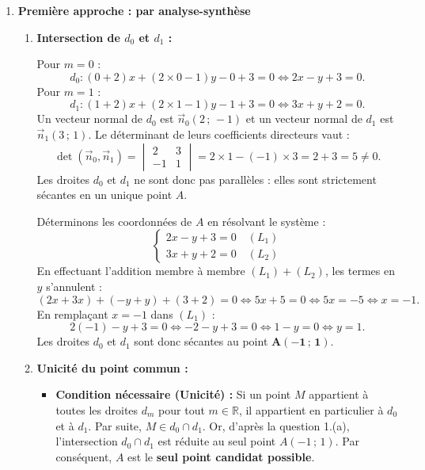 \documentclass[11pt,a4paper]{article}
\newcommand{\R}{\mathbb{R}}
\newcommand{\vect}[1]{\overrightarrow{#1}}
\begin{document}
\begin{correctionbox}
\begin{enumerate}
    \item \textbf{Première approche : par analyse-synthèse}
    \begin{enumerate}
        \item \textbf{Intersection de $d_0$ et $d_1$ :}
        
        Pour $m = 0$ :
        \[
        d_0 : (0 + 2)x + (2 \times 0 - 1)y - 0 + 3 = 0 \iff 2x - y + 3 = 0.
        \]
        Pour $m = 1$ :
        \[
        d_1 : (1 + 2)x + (2 \times 1 - 1)y - 1 + 3 = 0 \iff 3x + y + 2 = 0.
        \]
        Un vecteur normal de $d_0$ est $\vect{n}_0(2\,;\,-1)$ et un vecteur normal de $d_1$ est $\vect{n}_1(3\,;\,1)$.
        Le déterminant de leurs coefficients directeurs vaut :
        \[
        \det(\vect{n}_0, \vect{n}_1) = \begin{vmatrix} 2 & 3 \\ -1 & 1 \end{vmatrix} = 2 \times 1 - (-1) \times 3 = 2 + 3 = 5 \neq 0.
        \]
        Les droites $d_0$ et $d_1$ ne sont donc pas parallèles : elles sont strictement sécantes en un unique point $A$.
        
        Déterminons les coordonnées de $A$ en résolvant le système :
        \[
        \begin{cases}
        2x - y + 3 = 0 \quad (L_1) \\
        3x + y + 2 = 0 \quad (L_2)
        \end{cases}
        \]
        En effectuant l'addition membre à membre $(L_1) + (L_2)$, les termes en $y$ s'annulent :
        \[
        (2x + 3x) + (-y + y) + (3 + 2) = 0 \iff 5x + 5 = 0 \iff 5x = -5 \iff x = -1.
        \]
        En remplaçant $x = -1$ dans $(L_1)$ :
        \[
        2(-1) - y + 3 = 0 \iff -2 - y + 3 = 0 \iff 1 - y = 0 \iff y = 1.
        \]
        Les droites $d_0$ et $d_1$ sont donc sécantes au point $\mathbf{A(-1\,;\,1)}$.

        \item \textbf{Unicité du point commun :}
        
        \begin{itemize}[leftmargin=*]
            \item \textbf{Condition nécessaire (Unicité) :}
            Si un point $M$ appartient à toutes les droites $d_m$ pour tout $m \in \R$, il appartient en particulier à $d_0$ et à $d_1$.
            Par suite, $M \in d_0 \cap d_1$. Or, d'après la question 1.(a), l'intersection $d_0 \cap d_1$ est réduite au seul point $A(-1\,;\,1)$.
            Par conséquent, $A$ est le \textbf{seul point candidat possible}.
            

\end{itemize}
\end{enumerate}
\end{enumerate}
\end{correctionbox}
\end{document}
